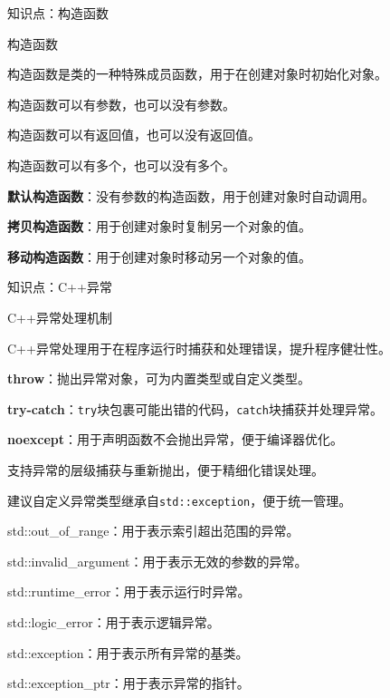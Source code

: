 \documentclass[UTF8,aspectratio=169]{beamer}
\begin{document}
\begin{frame}{知识点：构造函数}
    \begin{ytublock}{构造函数}
        \item 构造函数是类的一种特殊成员函数，用于在创建对象时初始化对象。
        \item 构造函数可以有参数，也可以没有参数。
        \item 构造函数可以有返回值，也可以没有返回值。
        \item 构造函数可以有多个，也可以没有多个。
        \item \textbf{默认构造函数}：没有参数的构造函数，用于创建对象时自动调用。
        \item \textbf{拷贝构造函数}：用于创建对象时复制另一个对象的值。
        \item \textbf{移动构造函数}：用于创建对象时移动另一个对象的值。
    \end{ytublock}
\end{frame}

\begin{frame}{知识点：C++异常}
    \begin{ytublock}{C++异常处理机制}
        \item C++异常处理用于在程序运行时捕获和处理错误，提升程序健壮性。
        \item \textbf{throw}：抛出异常对象，可为内置类型或自定义类型。
        \item \textbf{try-catch}：\texttt{try}块包裹可能出错的代码，\texttt{catch}块捕获并处理异常。
        \item \textbf{noexcept}：用于声明函数不会抛出异常，便于编译器优化。
        \item 支持异常的层级捕获与重新抛出，便于精细化错误处理。
        \item 建议自定义异常类型继承自\texttt{std::exception}，便于统一管理。
    \end{ytublock}
    \begin{ytublock}
        \item std::out_of_range：用于表示索引超出范围的异常。
        \item std::invalid_argument：用于表示无效的参数的异常。
        \item std::runtime_error：用于表示运行时异常。
        \item std::logic_error：用于表示逻辑异常。
        \item std::exception：用于表示所有异常的基类。
        \item std::exception\_ptr：用于表示异常的指针。
    \end{ytublock}
\end{frame}
\end{document}

